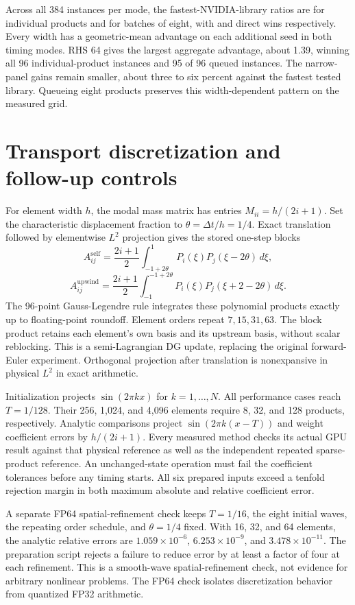 \documentclass[10pt]{article}
\begin{document}
Across all 384 instances per mode, the fastest-NVIDIA-library ratios are
\RobustLatencyOverall{} for individual products and
\RobustQueuedOverall{} for batches of eight, with
\RobustLatencyWins{} and \RobustQueuedWins{} direct wins respectively.
Every width has a geometric-mean advantage on each additional seed in
both timing modes. RHS 64 gives the largest aggregate advantage, about
1.39, winning all 96 individual-product instances and 95 of 96 queued
instances. The narrow-panel gains remain smaller, about three to six
percent against the fastest tested library. Queueing eight products
preserves this width-dependent pattern on the measured grid.



\section{Transport discretization and follow-up controls}
For element width \(h\), the modal mass matrix has entries
\(M_{ii}=h/(2i+1)\). Set the characteristic displacement fraction to
\(\theta=\Delta t/h=1/4\). Exact translation followed by elementwise
\(L^2\) projection gives the stored one-step blocks
\[
 A^{\mathrm{self}}_{ij}=\frac{2i+1}{2}
 \int_{-1+2\theta}^{1}P_i(\xi)P_j(\xi-2\theta)\,d\xi,
\]
\[
 A^{\mathrm{upwind}}_{ij}=\frac{2i+1}{2}
 \int_{-1}^{-1+2\theta}P_i(\xi)P_j(\xi+2-2\theta)\,d\xi.
\]
The 96-point Gauss-Legendre rule integrates these polynomial products exactly
up to floating-point roundoff. Element orders repeat \(7,15,31,63\).
The block product retains each element's own basis and its upstream basis,
without scalar reblocking. This is a semi-Lagrangian DG update, replacing
the original forward-Euler experiment. Orthogonal projection after translation
is nonexpansive in physical \(L^2\) in exact arithmetic.

Initialization projects \(\sin(2\pi kx)\) for \(k=1,\ldots,N\).
All performance cases reach \(T=1/128\). Their 256, 1,024, and 4,096 elements
require 8, 32, and 128 products, respectively. Analytic comparisons project
\(\sin(2\pi k(x-T))\) and weight coefficient errors by \(h/(2i+1)\).
Every measured method checks its actual GPU result against that physical
reference as well as the independent repeated sparse-product reference.
An unchanged-state operation must fail the coefficient tolerances before
any timing starts. All six prepared inputs exceed a tenfold rejection
margin in both maximum absolute and relative coefficient error.

A separate FP64 spatial-refinement check keeps \(T=1/16\), the eight initial
waves, the repeating order schedule, and \(\theta=1/4\) fixed. With 16, 32,
and 64 elements, the analytic relative errors are
\(1.059\times10^{-6}\), \(6.253\times10^{-9}\), and
\(3.478\times10^{-11}\). The preparation script rejects a failure to reduce
error by at least a factor of four at each refinement. This is a smooth-wave
spatial-refinement check, not evidence for arbitrary nonlinear problems.
The FP64 check isolates discretization behavior from quantized FP32 arithmetic.
\end{document}
